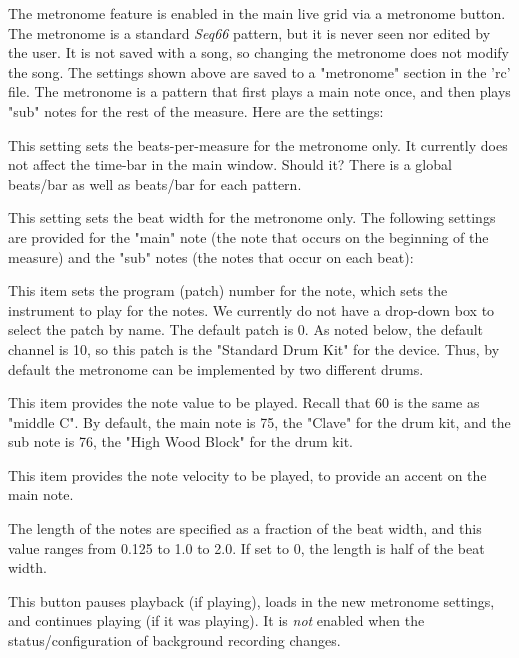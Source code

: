    \setcounter{ItemCounter}{0}      %

   The metronome feature is enabled in the main live grid via a metronome
   button.
   The metronome is a standard \textsl{Seq66} pattern, but it is never seen
   nor edited by the user.
   It is not saved with a song, so changing the metronome does not modify the
   song.
   The settings shown above are saved to a "metronome" section in the 'rc'
   file.
   The metronome is a pattern that first plays a main note once, and then
   plays "sub" notes for the rest of the measure.
   Here are the settings:

   This setting sets the beats-per-measure for the metronome only.
   It currently does not affect the time-bar in the main window.
   Should it? There is a global beats/bar as well as beats/bar for
   each pattern.

   This setting sets the beat width for the metronome only.
   The following settings are provided for the "main" note
   (the note that occurs on the beginning of the measure)
   and the "sub" notes (the notes that occur on each beat):

   This item sets the program (patch) number for the note, which sets the
   instrument to play for the notes.
   We currently do not have a drop-down box to select the patch by name.
   The default patch is 0.
   As noted below, the default channel is 10, so this
   patch is the "Standard Drum Kit" for the device.
   Thus, by default the metronome can be implemented by two different
   drums.

   This item provides the note value to be played.  Recall that 60 is the same
   as "middle C".  By default, the main note is 75, the "Clave" for the drum
   kit, and the sub note is 76, the "High Wood Block" for the drum kit.

   This item provides the note velocity to be played, to provide an accent on
   the main note.

   The length of the notes are specified as a fraction of the beat width, and
   this value ranges from 0.125 to 1.0 to 2.0.
   If set to 0, the length is half of the beat width.

   This button pauses playback (if playing),
   loads in the new metronome settings, and
   continues playing (if it was playing).
   It is \textsl{not} enabled when the status/configuration of background
   recording changes.

